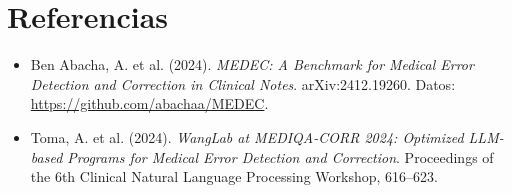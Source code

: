 \documentclass[11pt,a4paper]{article}
\begin{document}
\section*{Referencias}
{\small
\begin{itemize}\setlength{\itemsep}{2pt}
  \item[] Ben Abacha, A. et al. (2024). \emph{MEDEC: A
    Benchmark for Medical Error Detection and Correction in Clinical Notes}. arXiv:2412.19260.
    Datos: \url{https://github.com/abachaa/MEDEC}.
  \item[] Toma, A. et al. (2024). \emph{WangLab at MEDIQA-CORR 2024:
    Optimized LLM-based Programs for Medical Error Detection and Correction}. Proceedings of the 6th Clinical
    Natural Language Processing Workshop, 616--623.
\end{itemize}
}
\end{document}
